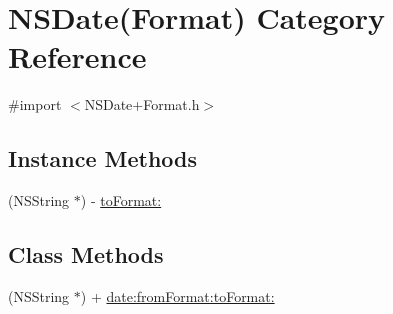 \hypertarget{category_n_s_date_07_format_08}{\section{N\-S\-Date(Format) Category Reference}
\label{category_n_s_date_07_format_08}
}


{\ttfamily \#import $<$N\-S\-Date+\-Format.\-h$>$}

\subsection*{Instance Methods}
\begin{DoxyCompactItemize}
\item 
(N\-S\-String $\ast$) -\/ \hyperlink{category_n_s_date_07_format_08_a5a7c194a8c1f8f9f5602879fe73c59b8}{to\-Format\-:}
\end{DoxyCompactItemize}
\subsection*{Class Methods}
\begin{DoxyCompactItemize}
\item 
(N\-S\-String $\ast$) + \hyperlink{category_n_s_date_07_format_08_a1c5b887cf6e8aff4e00df5a7bb8aa777}{date\-:from\-Format\-:to\-Format\-:}
\end{DoxyCompactItemize}



